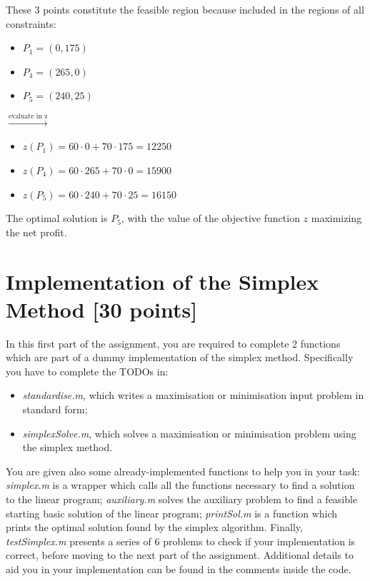 \documentclass[unicode,11pt,a4paper,oneside,numbers=endperiod,openany]{scrartcl}
\begin{document}
These 3 points constitute the feasible region
because included in the regions of all constraints:

\vspace{0.5cm}
\begin{minipage}{0.3\textwidth}
	\begin{itemize}
		\setlength\itemsep{0.5em}
		\item $P_1 = (0, 175)$
		\item $P_4 = (265, 0)$
		\item $P_5 = (240, 25)$
	\end{itemize}
\end{minipage}
\begin{minipage}{0.2\textwidth}
	$\xrightarrow{\text{evaluate in z}}$
\end{minipage}
\begin{minipage}{0.5\textwidth}
	\begin{itemize}
		\setlength\itemsep{0.5em}
		\item $z(P_1) = 60 \cdot 0 + 70 \cdot 175 = 12 250$
		\item $z(P_4) = 60 \cdot 265 + 70 \cdot 0 = 15 900$
		\item $z(P_5) = 60 \cdot 240 + 70 \cdot 25 = 16 150$
	\end{itemize}
\end{minipage}
\vspace{0.5cm}

The optimal solution is $P_5$,
with the value of the objective function $z$ maximizing the net profit.

\vspace{0.5cm}

\section{Implementation of the Simplex Method [30 points]}

In this first part of the assignment, you are required to complete 2 functions which are part of a dummy implementation of the simplex method. Specifically you have to complete the TODOs in:
\begin{itemize}
	\item \emph{standardise.m}, which writes a maximisation or minimisation input problem in standard form;
	\item \emph{simplexSolve.m}, which solves a maximisation or minimisation problem using the simplex method.
\end{itemize}
You are given also some already-implemented functions to help you in your task: \emph{simplex.m} is a wrapper which calls all the functions necessary to find a solution to the linear program; \emph{auxiliary.m} solves the auxiliary problem to find a feasible starting basic solution of the linear program; \emph{printSol.m} is a function which prints the optimal solution found by the simplex algorithm. Finally, \emph{testSimplex.m} presents a series of 6 problems to check if your implementation is correct, before moving to the next part of the assignment. Additional details to aid you in your implementation can be found in the comments inside the code.
\end{document}
